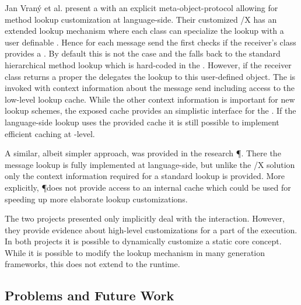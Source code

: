 Jan Vran\'{y} et al. present a \ST with an explicit meta-object-protocol allowing for method lookup customization at language-side\cite{Vran12a}.
Their customized \ST/X \VM has an extended lookup mechanism where each class can specialize the lookup with a user definable .
Hence for each message send the \VM first checks if the receiver's class provides a .
By default this is not the case and the \VM falls back to the standard hierarchical \ST method lookup which is hard-coded in the \VM.
However, if the receiver class returns a proper  the \VM delegates the lookup to this user-defined object.
The  is invoked with context information about the message send including access to the low-level lookup cache.
While the other context information is important for new lookup schemes, the exposed cache provides an simplistic interface for the \JIT.
If the language-side lookup uses the provided cache it is still possible to implement efficient caching at \VM-level.


A similar, albeit simpler approach, was provided in the research \ST \VM \P \cite{Verw12a}.
There the message lookup is fully implemented at language-side, but unlike the \ST/X solution only the context information required for a standard \ST lookup is provided.
More explicitly, \P does not provide access to an internal cache which could be used for speeding up more elaborate lookup customizations.

The two projects presented only implicitly deal with the \JIT interaction.
However, they provide evidence about high-level customizations for a part of the execution.
In both projects it is possible to dynamically customize a static core \VM concept.
While it is possible to modify the lookup mechanism in many \VM generation frameworks, this does not extend to the runtime.



\subsection{\NBJ Problems and Future Work}
